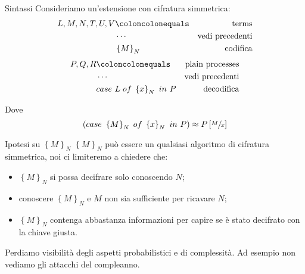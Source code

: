 \documentclass{beamer}
\theoremstyle{plain}
\theoremstyle{definition}
\theoremstyle{remark}
\newcommand{\set}[1]{\left\{#1\right\}}
\newcommand{\pa}[1]{\left(#1\right)}
\newcommand{\bra}[1]{\left[#1\right]}
\begin{document}
\begin{frame}{Sintassi}
  Consideriamo un'estensione con cifratura simmetrica:
  \begin{align*}
    L,M,N,T,U,V & \coloncolonequals & \text{terms} \\
                & \cdots & \text{vedi precedenti} \\
                & \set{M}_N & \text{codifica}
  \end{align*}
  \begin{align*}
    P,Q,R & \coloncolonequals & \text{plain processes} \\
          & \cdots & \text{vedi precedenti} \\
          & case\ L\; of\; \set{x}_N\ in\ P & \text{decodifica}
  \end{align*}

  Dove
  \[ \pa{ case\ \set{M}_N\; of\; \set{x}_N\ in\ P} \approx
    P\bra{\sfrac{M}{x}} \]
\end{frame}

\begin{frame}{Ipotesi su $\set{M}_N$}
  $\set{M}_N$ pu\`o essere un qualsiasi algoritmo di cifratura simmetrica,
  noi ci limiteremo a chiedere che:
  \begin{itemize}
  \item $\set{M}_N$ si possa decifrare solo conoscendo $N$;
  \item conoscere $\set{M}_N$ e $M$ non sia sufficiente per ricavare $N$;
  \item $\set{M}_N$ contenga abbastanza informazioni per capire se \`e stato
    decifrato con la chiave giusta.
  \end{itemize}
  \vfill
  \pause

  Perdiamo visibilit\`a degli aspetti probabilistici e di
  complessit\`a. Ad esempio non vediamo gli attacchi del compleanno.
\end{frame}
\end{document}

